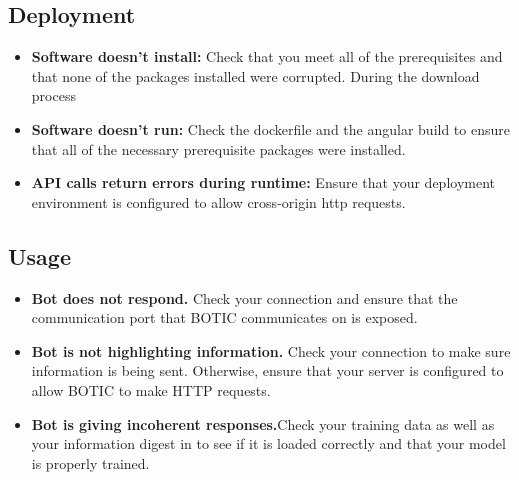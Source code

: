 \documentclass[11pt]{article}
\begin{document}
\subsection{Deployment}
\begin{itemize}
    \item \textbf{Software doesn't install:} Check that you meet all of the prerequisites and that none of the packages installed were corrupted. During the download process
    \item \textbf{Software doesn't run:} Check the dockerfile and the angular build to ensure that all of the necessary prerequisite packages were installed.
    \item \textbf{API calls return errors during runtime:} Ensure that your deployment environment is configured to allow cross-origin http requests.
\end{itemize}

\subsection {Usage}
\begin{itemize}
        \item \textbf{Bot does not respond.} Check your connection and ensure that the communication port that BOTIC communicates on is exposed.
        \item\textbf{Bot is not highlighting information.} Check your connection to make sure information is being sent. Otherwise, ensure that your server is configured to allow BOTIC to make HTTP requests.
        \item \textbf{Bot is giving incoherent responses.}Check your training data as well as your information digest in to see if it is loaded correctly and that your model is properly trained.
\end{itemize}
\end{document}
